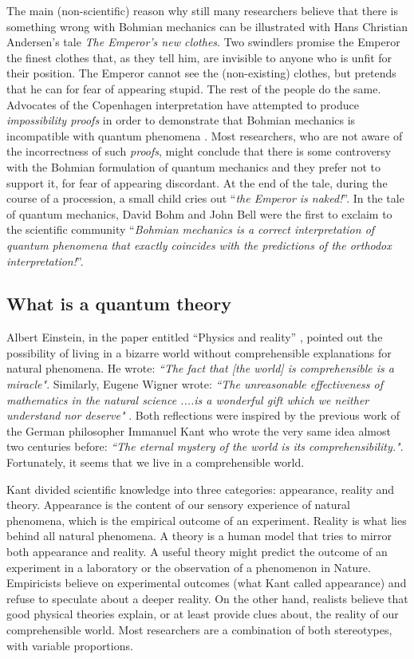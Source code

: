 \documentclass[nofootinbib, secnumarabic, amsmath, nobibnotes,10pt,aps,pra]{revtex4-1}
\begin{document}
The main (non-scientific) reason why still many researchers believe that there is something wrong with Bohmian mechanics can be illustrated with Hans Christian Andersen's tale \emph{The Emperor's new clothes}. Two swindlers promise the Emperor the finest clothes that, as they tell him,  are invisible to anyone who is unfit for their position. The Emperor cannot see the (non-existing) clothes, but pretends that he can for fear of appearing stupid.  The rest of the people do the same. Advocates of the Copenhagen interpretation have attempted to produce \emph{impossibility proofs} in order to demonstrate that Bohmian mechanics is incompatible with quantum phenomena \cite{om.impossibility_proofs}. Most researchers, who are not aware of the incorrectness of such \emph{proofs}, might conclude that there is some controversy with the Bohmian formulation of quantum mechanics and they prefer not to support it, for fear of appearing discordant. At the end of the tale, during the course of a procession, a small child cries out ``\textit{the Emperor is naked!}''. In the tale of quantum mechanics, David Bohm \cite{om.bohm1952a,om.bohm1952b} and John Bell \cite{om.Bell1987} were the first to exclaim to the scientific community ``\textit{Bohmian mechanics is a correct interpretation of quantum phenomena that exactly coincides with the predictions of the orthodox interpretation!}''.


\subsection{What is a quantum theory}
\label{sec_onto}

Albert Einstein, in the paper entitled ``Physics and reality'' \cite{einstein}, pointed out the possibility of living in a bizarre world without comprehensible explanations for natural phenomena. He wrote: \emph{``The fact that [the world] is comprehensible is a miracle"}. Similarly, Eugene Wigner wrote: \emph{``The unreasonable effectiveness of mathematics in the natural science ....is a wonderful gift which we neither understand nor deserve"} \cite{wigner}. Both reflections were inspired by the previous work of the German philosopher Immanuel Kant who wrote the very same idea almost two centuries before: \emph{``The eternal mystery of the world is its comprehensibility."}. Fortunately, it seems that we  live in a comprehensible world.

Kant divided scientific knowledge into three  categories: appearance, reality and theory. Appearance is the content of our sensory experience of natural phenomena, which is the empirical outcome of an experiment. Reality is what lies behind all natural phenomena. A theory is a human model that tries to mirror both appearance and reality. A useful theory might predict the outcome of an experiment in a laboratory or the observation of a phenomenon in Nature. Empiricists believe on experimental outcomes (what Kant called appearance) and refuse to speculate about a deeper reality. On the other hand, realists believe that good physical theories explain, or at least provide clues about, the reality of our comprehensible world. Most researchers are a combination of both stereotypes, with variable proportions.
\end{document}
